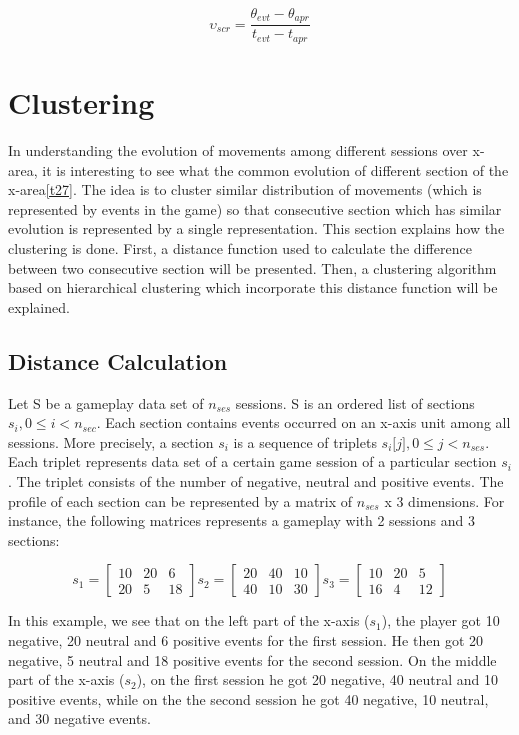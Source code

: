 $$ \upsilon_{scr} = \frac{\theta_{evt}-\theta_{apr}}{\textit{t}_{evt}-\textit{t}_{apr}} $$

\section{Clustering}

In understanding the evolution of movements among different sessions over x-area, it is interesting to see what the common evolution of different section of the x-area\ref{t27}. The idea is to cluster similar distribution of movements (which is represented by events in the game) so that consecutive section which has similar evolution is represented by a single representation. This section explains how the clustering is done. First, a distance function used to calculate the difference between two consecutive section will be presented. Then, a clustering algorithm based on hierarchical clustering which incorporate this distance function will be explained.

\subsection{Distance Calculation}
Let S be a gameplay data set of $n_{ses}$ sessions. S is an ordered list of sections $s_i, 0 \le i < n_{sec}$. Each section contains events occurred on an x-axis unit among all sessions. More precisely, a  section $s_i$ is a sequence of triplets $s_i\lbrack j \rbrack, 0 \le j < n_{ses}$. Each triplet represents data set of a certain game session of a particular section $s_i$. The triplet consists of the number of negative, neutral and positive events. The profile of each section can be represented by a matrix of $n_{ses}$ x 3 dimensions. For instance, the following matrices represents a gameplay with 2 sessions and 3 sections:

\[
\textit{s}_1 = \begin{bmatrix}
  10 & 20 & 6\\
  20 & 5 & 18
\end{bmatrix}
\textit{s}_2 = \begin{bmatrix}
  20 & 40 & 10\\ 
  40 & 10 & 30
\end{bmatrix}
\textit{s}_3 = \begin{bmatrix}
  10 & 20 & 5\\
  16 & 4 & 12 
\end{bmatrix}
\]

In this example, we see that on the left part of the x-axis ($s_1$), the player got 10 negative, 20 neutral and 6 positive events for the first session. He then got 20 negative, 5 neutral and 18 positive events for the second session. On the middle part of the x-axis ($s_2$), on the first session he got 20 negative, 40 neutral and 10 positive events, while on the the second session he got 40 negative, 10 neutral, and 30 negative events.

